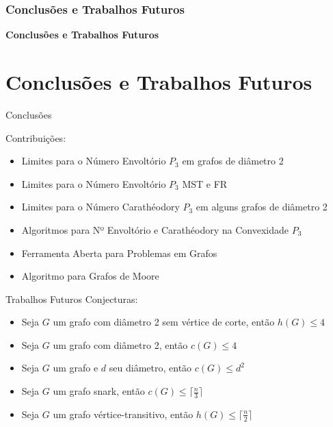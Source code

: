 \begin{frame}
\frametitle{Conclusões e Trabalhos Futuros}
\centering
\textbf{Conclusões e Trabalhos Futuros}
\end{frame}




\section{Conclusões e Trabalhos Futuros}
\begin{frame}{Conclusões}

Contribuições:
\begin{itemize}
\item Limites para o Número Envoltório $P_3$ em grafos de diâmetro 2
\item Limites para o Número Envoltório $P_3$ MST e FR
\item Limites para o Número Carathéodory $P_3$ em alguns grafos de diâmetro 2
\item Algoritmos para Nº Envoltório e Carathéodory na Convexidade $P_3$
\item Ferramenta Aberta para Problemas em Grafos
\item Algoritmo para Grafos de Moore
\end{itemize}
\end{frame}


\begin{frame}{Trabalhos Futuros}
Conjecturas:
\begin{itemize}
\item Seja $G$ um grafo com diâmetro 2 sem vértice de corte, então $h(G) \le 4$
\item Seja $G$ um grafo com diâmetro 2, então $c(G) \le 4$
\item Seja $G$ um grafo e $d$ seu diâmetro, então $c(G) \le d^2$
\item Seja $G$ um grafo snark, então $c(G) \le \lceil\frac{n}{3}\rceil$
\item Seja $G$ um grafo vértice-transitivo, então $h(G) \le \lceil\frac{n}{2}\rceil$
\end{itemize}
\end{frame}

